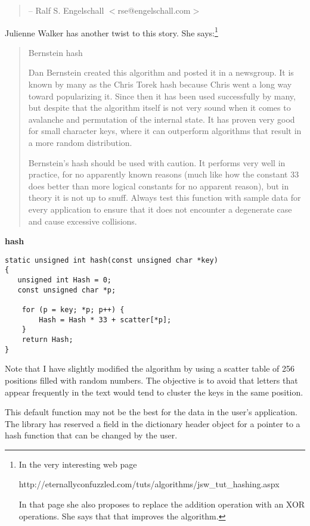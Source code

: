 \documentclass[12pt,a4paper]{memoir} %
\newcommand{\function}[1] {%
\vspace{0.2in}
\par\noindent
\textbf{#1}\index{#1!code for \container} \hrulefill
\nopagebreak
\noindent\begin{verbatim}}
\begin{document}
{{\begin{quotation}
{                 -- Ralf S. Engelschall $<$rse@engelschall.com$>$
}                
\end{quotation}
Julienne Walker has another twist to this story. She says:\footnote{In the very interesting web page \par\noindent
http://eternallyconfuzzled.com/tuts/algorithms/jsw\_tut\_hashing.aspx\par\noindent In that page she also proposes to replace the addition operation with an XOR operations. She says that that improves the algorithm.}
\begin{quotation}
Bernstein hash

Dan Bernstein created this algorithm and posted it in a newsgroup. It is known by many as the Chris Torek hash because Chris went a long way toward popularizing it. Since then it has been used successfully by many, but despite that the algorithm itself is not very sound when it comes to avalanche and permutation of the internal state. It has proven very good for small character keys, where it can outperform algorithms that result in a more random distribution.

Bernstein's hash should be used with caution. It performs very well in practice, for no apparently known reasons (much like how the constant 33 does better than more logical constants for no apparent reason), but in theory it is not up to snuff. Always test this function with sample data for every application to ensure that it does not encounter a degenerate case and cause excessive collisions.
\end{quotation}
\function{hash}
static unsigned int hash(const unsigned char *key)
{
   unsigned int Hash = 0;
   const unsigned char *p;
		
    for (p = key; *p; p++) {
        Hash = Hash * 33 + scatter[*p];
    }
    return Hash;
}
\end{verbatim}
Note that I have slightly modified the algorithm by using a scatter table of 256 positions filled with random numbers. The objective is to avoid
that letters that appear frequently in the text would tend to cluster the keys in  the same position.

This default function may not be the best for the data in the user's application. The library has reserved a field in the dictionary header object for a pointer to a hash function that can be changed by the user.

}}
\end{document}
